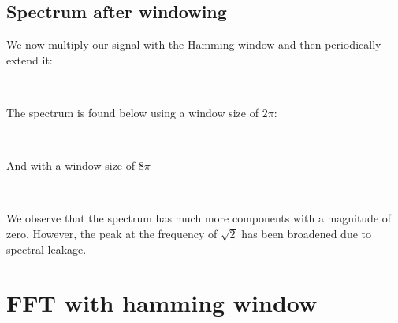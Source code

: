 \documentclass[11pt]{article}
\begin{document}
    \subsection{Spectrum after windowing}\label{spectrum-after-windowing}

	

	
		
    We now multiply our signal with the Hamming window and then periodically
extend it:

	

	

    \begin{center}
    \end{center}
    { \hspace*{\fill} \\}
    
	
		
    The spectrum is found below using a window size of \(2 \pi\):

	

	

    \begin{center}
    \end{center}
    { \hspace*{\fill} \\}
    
	
		
    And with a window size of \(8 \pi\)

	

	

    \begin{center}
    \end{center}
    { \hspace*{\fill} \\}
    
	
		
    We observe that the spectrum has much more components with a magnitude
of zero. However, the peak at the frequency of \(\sqrt{2}\) has been
broadened due to spectral leakage.

	

	
		
    \section{FFT with hamming window}\label{fft-with-hamming-window}
\end{document}
